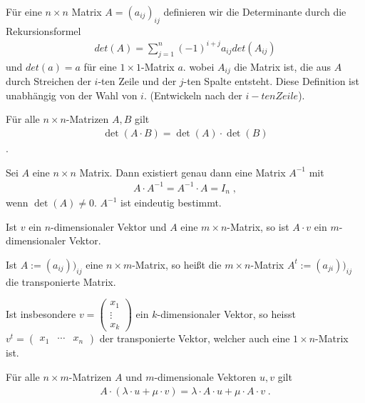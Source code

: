 \begin{Satz}
Für eine $n \times n$ Matrix $A = (a_{ij})_{ij}$ definieren wir die Determinante durch die Rekursionsformel
\begin{align*}
det (A) = \sum_{j=1}^n  (-1)^{i+j} a_{ij} det (A_{ij})
\end{align*}
und $det (a) = a$ für eine $1 \times 1$-Matrix $a$.
wobei $A_{ij}$ die Matrix ist, die aus $A$ durch Streichen der $i$-ten Zeile und der $j$-ten Spalte entsteht.
Diese Definition ist unabhängig von der Wahl von $i$. (Entwickeln nach der $i-ten Zeile$).
\end{Satz}

\begin{Satz}
Für alle $n \times n$-Matrizen $A,B$ gilt
\begin{align*}
\det(A \cdot B) = \det(A) \cdot \det(B)
\end{align*} \; .
\end{Satz}
\begin{Satz}
Sei $A$ eine $n \times n$ Matrix. Dann existiert genau dann eine Matrix $A^{-1}$ mit
\begin{align*}
A \cdot A^{-1}  = A^{-1} \cdot A  = I_n \; ,
\end{align*}
wenn $\det(A) \neq 0$. $A^{-1}$ ist eindeutig bestimmt.
\end{Satz}
\begin{Bemerkung}
Ist $v$ ein $n$-dimensionaler Vektor und $A$ eine $m\times n$-Matrix, so ist 
$A \cdot v$ ein $m$-dimensionaler Vektor.
\end{Bemerkung}

\begin{Definition}
Ist $A := (a_{ij}))_{ij}$ eine $n \times m$-Matrix, so heißt die $m \times n$-Matrix 
$A ^t := (a_{ji}))_{ij}$ die transponierte Matrix. 
\end{Definition}


\begin{Definition}
Ist insbesondere $v= \begin{pmatrix}
x_1 \\ \vdots \\ x_k
\end{pmatrix}
$ ein $k$-dimensionaler Vektor, so heisst
$v^t= \begin{pmatrix}
x_1 & \cdots & x_n
\end{pmatrix}$ der transponierte Vektor, welcher auch eine $1\times n$-Matrix ist.
\end{Definition}

\begin{Satz}
Für alle $n \times m$-Matrizen $A$ und $m$-dimensionale Vektoren $u,v$ gilt
\begin{align*}
A \cdot (\lambda \cdot u + \mu \cdot v) = \lambda \cdot A \cdot u +  \mu  \cdot A \cdot v \; .
\end{align*}
\end{Satz}

